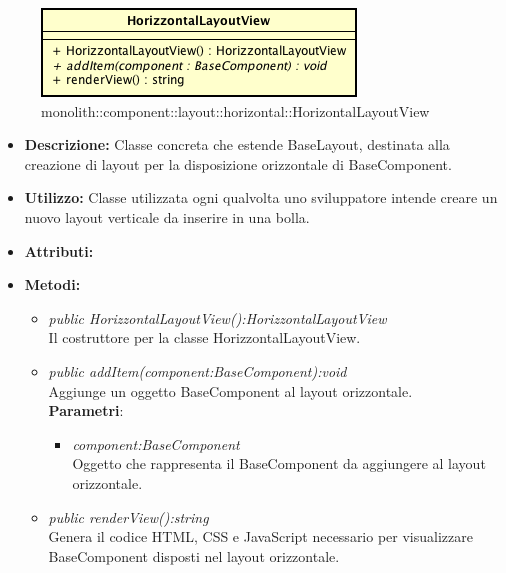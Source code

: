 \label{monolith::component::layout::horizontal::HorizontalLayoutView}
\begin{figure}[ht]
	\centering
	\includegraphics[scale=0.5]{Sezioni/SottosezioniST/img/HorizontalLayoutView.png}
	\caption{monolith::component::layout::horizontal::HorizontalLayoutView}
\end{figure}

\begin{itemize}
\item \textbf{Descrizione:} Classe concreta che estende BaseLayout, destinata alla creazione di layout  per la disposizione orizzontale di BaseComponent.
\item \textbf{Utilizzo:} Classe utilizzata ogni qualvolta uno sviluppatore intende creare un nuovo layout verticale da inserire in una bolla.
\item \textbf{Attributi:}
\item \textbf{Metodi:}
\begin{itemize}
\item\textit{public HorizzontalLayoutView():HorizzontalLayoutView}\\
Il costruttore per la classe HorizzontalLayoutView.
\item \textit{public addItem(component:BaseComponent):void}\\
Aggiunge un oggetto BaseComponent al layout orizzontale.
\\ \textbf{Parametri}: \begin{itemize}
\item \textit{component:BaseComponent}\\
Oggetto che rappresenta il BaseComponent da aggiungere al layout orizzontale.
\end{itemize}
\item \textit{public renderView():string}\\
Genera il codice HTML, CSS e JavaScript necessario per visualizzare BaseComponent disposti nel layout orizzontale.
\end{itemize}
\end{itemize}